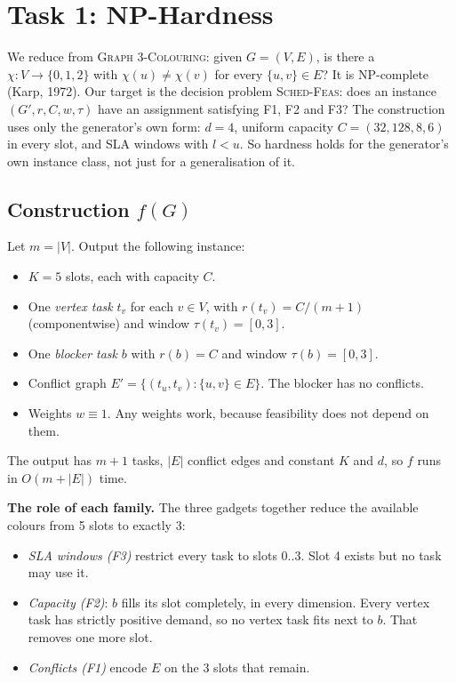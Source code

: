\section{Task 1: NP-Hardness}

We reduce from \textsc{Graph 3-Colouring}: given $G=(V,E)$, is there a
$\chi:V\to\{0,1,2\}$ with $\chi(u)\neq\chi(v)$ for every $\{u,v\}\in E$?
It is NP-complete (Karp, 1972). Our target is the decision problem
\textsc{Sched-Feas}: does an instance $(G',r,C,w,\tau)$ have an assignment
satisfying F1, F2 and F3? The construction uses only the generator's own
form: $d=4$, uniform capacity $C=(32,128,8,6)$ in every slot, and SLA
windows with $l<u$. So hardness holds for the generator's own instance class, not just for a
generalisation of it.

\subsection{Construction $f(G)$}
Let $m=|V|$. Output the following instance:
\begin{itemize}
\item $K=5$ slots, each with capacity $C$.
\item One \emph{vertex task} $t_v$ for each $v\in V$, with $r(t_v)=C/(m+1)$
  (componentwise) and window $\tau(t_v)=[0,3]$.
\item One \emph{blocker task} $b$ with $r(b)=C$ and window $\tau(b)=[0,3]$.
\item Conflict graph $E'=\{(t_u,t_v):\{u,v\}\in E\}$. The blocker has no
  conflicts.
\item Weights $w\equiv 1$. Any weights work, because feasibility does not
  depend on them.
\end{itemize}
The output has $m+1$ tasks, $|E|$ conflict edges and constant $K$ and $d$,
so $f$ runs in $O(m+|E|)$ time.

\textbf{The role of each family.} The three gadgets together reduce the
available colours from 5 slots to exactly 3:
\begin{itemize}
\item \emph{SLA windows (F3)} restrict every task to slots $0..3$. Slot 4
  exists but no task may use it.
\item \emph{Capacity (F2)}: $b$ fills its slot completely, in every
  dimension. Every vertex task has strictly positive demand, so no vertex
  task fits next to $b$. That removes one more slot.
\item \emph{Conflicts (F1)} encode $E$ on the 3 slots that remain.
\end{itemize}


